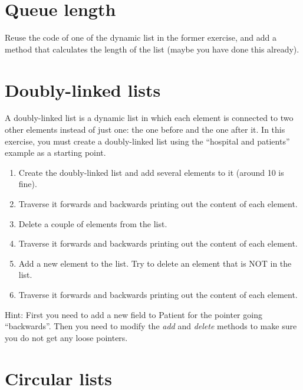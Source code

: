 \documentclass{article}
\begin{document}
\section{Queue length}
\label{sec:queue-length}

Reuse the code of one of the dynamic list in the former exercise, and
add a method that calculates the length of the list (maybe you have
done this already). 


\section{Doubly-linked lists}
\label{sec:doublyr-linked-lists}

A doubly-linked list is a dynamic list in which each element is
connected to two other elements instead of just one: the one before
and the one after it. In this exercise, you must create a
doubly-linked list using the ``hospital and patients'' example as a
starting point.

\begin{enumerate}
\item Create the doubly-linked list and add several elements to it
  (around 10 is fine). 
\item Traverse it forwards and backwards printing out the content of
  each element.
\item Delete a couple of elements from the list. 
\item Traverse it forwards and backwards printing out the content of
  each element.
\item Add a new element to the list. Try to delete an element that is
  NOT in the list. 
\item Traverse it forwards and backwards printing out the content of
  each element.
\end{enumerate}

Hint: First you need to add a new field to Patient for the pointer
going ``backwards''. Then you need to modify the \emph{add} and
\emph{delete} methods to make sure you do not get any loose pointers. 

\section{Circular lists}
\label{sec:circular-lists}
\end{document}
